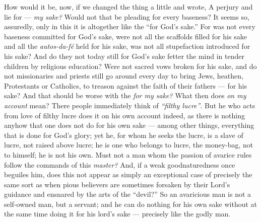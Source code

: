 How would it be, now, if we changed the thing a little and wrote, A perjury 
and lie for --- \textit{my sake?} Would not that be pleading for every 
baseness? It seems so, assuredly, only in this it is altogether like the 
``for God's sake.'' For was not every baseness committed for God's sake, 
were not all the scaffolds filled for his sake and all the 
\textit{autos-da-f\'e} held for his sake, was not all stupefaction introduced 
for his sake? And do they not today still for God's sake fetter the mind in 
tender children by religious education? Were not sacred vows broken for his 
sake, and do not missionaries and priests still go around every day to bring 
Jews, heathen, Protestants or Catholics, to treason against the faith of their 
fathers --- for his sake? And that should be worse with the \textit{for my 
sake?} What then does \textit{on my account} mean? There people immediately 
think of \textit{``filthy lucre''}. But he who acts from love of filthy 
lucre does it on his own account indeed, as there is nothing anyhow that one 
does not do for his own sake --- among other things, everything that is done 
for God's glory; yet he, for whom he seeks the lucre, is a slave of lucre, not 
raised above lucre; he is one who belongs to lucre, the money-bag, not to 
himself; he is not his own. Must not a man whom the passion of avarice rules 
follow the commands of this \textit{master?} And, if a weak goodnaturedness 
once beguiles him, does this not appear as simply an exceptional case of 
precisely the same sort as when pious believers are sometimes forsaken by 
their Lord's guidance and ensnared by the arts of the ``devil?'' So an 
avaricious man is not a self-owned man, but a servant; and he can do nothing 
for his own sake without at the same time doing it for his lord's sake --- precisely like the godly man.

